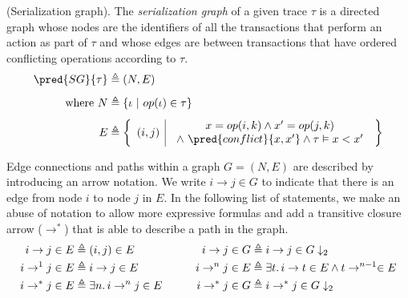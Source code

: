 \begin{defn}
	\label{defn:sg}
	(Serialization graph).
	The \emph{serialization graph} of a given trace $\tau$ is a directed graph whose nodes are the identifiers of all the transactions that perform an action as part of $\tau$ and whose edges are between transactions that have ordered conflicting operations according to $\tau$.
	\begin{align*}
		\pred{SG}{\tau} &\triangleq (N, E) \\[0.4em]
		\text{where } N &\triangleq \{ \iota\ |\ op(\iota) \in \tau \} \\[0.4em]
		E &\triangleq
			\left\{
				\begin{array}{r | l}
					(i, j)
					&
					\begin{array}{c}
						x = op(i, k) \land x' = op(j, k) \\
						\land\ \pred{conflict}{x, x'}
						\land \tau \vDash x < x' 
					\end{array}
				\end{array}
			\right\}
	\end{align*}
\end{defn}

Edge connections and paths within a graph $G = (N, E)$ are described by introducing an arrow notation. We write $i \rightarrow j \in G$ to indicate that there is an edge from node $i$ to node $j$ in $E$. In the following list of statements, we make an abuse of notation to allow more expressive formulas and add a transitive closure arrow ($\rightarrow^*$) that is able to describe a path in the graph.
\[
	\begin{array}{c @{\hspace{30pt}} c}
		\begin{aligned}
			i \rightarrow j \in E &\triangleq (i, j) \in E \\
			i \rightarrow^1 j \in E &\triangleq i \rightarrow j \in E \\
			i \rightarrow^* j \in E &\triangleq \exists n \ldotp i \rightarrow^n j \in E
		\end{aligned}
		&
		\begin{aligned}
			i \rightarrow j \in G &\triangleq i \rightarrow j \in G \downarrow_2 \\
			i \rightarrow^n j \in E &\triangleq \exists t \ldotp i \rightarrow t \in E \land t \rightarrow^{n-1} \in E \\
			i \rightarrow^* j \in G &\triangleq i \rightarrow^* j \in G \downarrow_2
		\end{aligned}
	\end{array}		
\]

